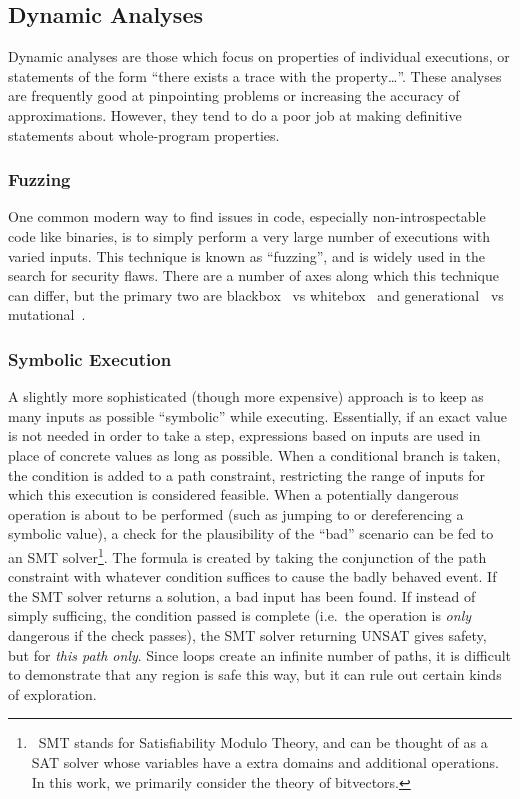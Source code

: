 \subsection{Dynamic Analyses}
Dynamic analyses are those which focus on properties of individual executions, or statements of the form ``there exists a trace with the property\ldots''.
These analyses are frequently good at pinpointing problems or increasing the accuracy of approximations.
However, they tend to do a poor job at making definitive statements about whole-program properties.

\subsubsection{Fuzzing}
One common modern way to find issues in code, especially non-introspectable code like binaries, is to simply perform a very large number of executions with varied inputs.
This technique is known as ``fuzzing'', and is widely used in the search for security flaws.
There are a number of axes along which this technique can differ, but the primary two are blackbox~\cite{peach,zzuf,rebert2014} vs whitebox~\cite{klee,godefroid2008,avgerinos2014} and generational~\cite{peach} vs mutational~\cite{zzuf}.

\subsubsection{Symbolic Execution}
A slightly more sophisticated (though more expensive) approach is to keep as many inputs as possible ``symbolic'' while executing.
Essentially, if an exact value is not needed in order to take a step, expressions based on inputs are used in place of concrete values as long as possible.
When a conditional branch is taken, the condition is added to a path constraint, restricting the range of inputs for which this execution is considered feasible.
When a potentially dangerous operation is about to be performed (such as jumping to or dereferencing a symbolic value), a check for the plausibility of the ``bad'' scenario can be fed to an SMT solver\footnote{\
SMT stands for Satisfiability Modulo Theory, and can be thought of as a SAT solver whose variables have a extra domains and additional operations. In this work, we primarily consider the theory of bitvectors.
}.
The formula is created by taking the conjunction of the path constraint with whatever condition suffices to cause the badly behaved event.
If the SMT solver returns a solution, a bad input has been found\cite{aeg,mayhem}.
If instead of simply sufficing, the condition passed is complete (i.e.\ the operation is \emph{only} dangerous if the check passes), the SMT solver returning UNSAT gives safety, but for \emph{this path only}.
Since loops create an infinite number of paths, it is difficult to demonstrate that any region is safe this way, but it can rule out certain kinds of exploration.


